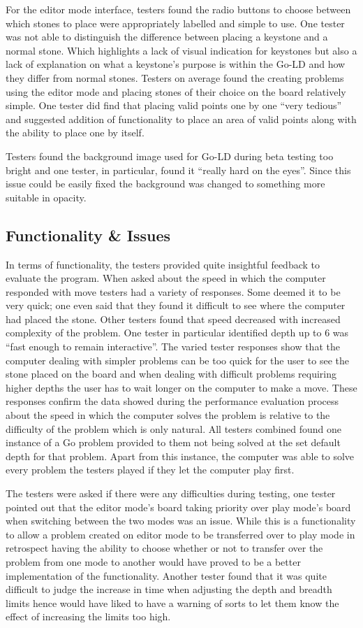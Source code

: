 \documentclass{l4proj}
\begin{document}
For the editor mode interface, testers found the radio buttons to choose between which stones to place were appropriately labelled and simple to use. One tester was not able to distinguish the difference between placing a keystone and a normal stone. Which highlights a lack of visual indication for keystones but also a lack of explanation on what a keystone’s purpose is within the Go-LD and how they differ from normal stones. Testers on average found the creating problems using the editor mode and placing stones of their choice on the board relatively simple. One tester did find that placing valid points one by one “very tedious” and suggested addition of functionality to place an area of valid points along with the ability to place one by itself.

Testers found the background image used for Go-LD during beta testing too bright and one tester, in particular, found it “really hard on the eyes”.  Since this issue could be easily fixed the background was changed to something more suitable in opacity.

\subsection{Functionality \& Issues}
In terms of functionality, the testers provided quite insightful feedback to evaluate the program. When asked about the speed in which the computer responded with move testers had a variety of responses. Some deemed it to be very quick; one even said that they found it difficult to see where the computer had placed the stone. Other testers found that speed decreased with increased complexity of the problem. One tester in particular identified depth up to 6 was “fast enough to remain interactive”. The varied tester responses show that the computer dealing with simpler problems can be too quick for the user to see the stone placed on the board and when dealing with difficult problems requiring higher depths the user has to wait longer on the computer to make a move. These responses confirm the data showed during the performance evaluation process about the speed in which the computer solves the problem is relative to the difficulty of the problem which is only natural.
All testers combined found one instance of a Go problem provided to them not being solved at the set default depth for that problem. Apart from this instance, the computer was able to solve every problem the testers played if they let the computer play first.

The testers were asked if there were any difficulties during testing, one tester pointed out that the editor mode’s board taking priority over play mode’s board when switching between the two modes was an issue. While this is a functionality to allow a problem created on editor mode to be transferred over to play mode in retrospect having the ability to choose whether or not to transfer over the problem from one mode to another would have proved to be a better implementation of the functionality. Another tester found that it was quite difficult to judge the increase in time when adjusting the depth and breadth limits hence would have liked to have a warning of sorts to let them know the effect of increasing the limits too high.
\end{document}
